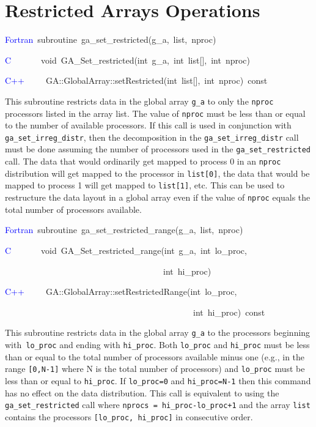 \section{Restricted Arrays Operations}
\begin{lyxcode}
\textcolor{blue}{Fortran}~subroutine~ga\_set\_restricted(g\_a,~list,~nproc)~

\textcolor{blue}{C~}~~~~~~void~GA\_Set\_restricted(int~g\_a,~int~list{[}{]},~int~nproc)~

\textcolor{blue}{C++}~~~~~GA::GlobalArray::setRestricted(int~list{[}{]},~int~nproc)~const
\end{lyxcode}
This subroutine restricts data in the global array \texttt{g\_a} to
only the \texttt{nproc} processors listed in the array list. The value
of \texttt{nproc} must be less than or equal to the number of available
processors. If this call is used in conjunction with \texttt{ga\_set\_irreg\_distr},
then the decomposition in the \texttt{ga\_set\_irreg\_distr} call
must be done assuming the number of processors used in the \texttt{ga\_set\_restricted}
call. The data that would ordinarily get mapped to process 0 in an
\texttt{nproc} distribution will get mapped to the processor in \texttt{list{[}0{]}},
the data that would be mapped to process 1 will get mapped to \texttt{list{[}1{]}},
etc. This can be used to restructure the data layout in a global array
even if the value of \texttt{nproc} equals the total number of processors
available. 
\begin{lyxcode}
\textcolor{blue}{Fortran}~subroutine~ga\_set\_restricted\_range(g\_a,~list,~nproc)~

\textcolor{blue}{C}~~~~~~~void~GA\_Set\_restricted\_range(int~g\_a,~int~lo\_proc,~

~~~~~~~~~~~~~~~~~~~~~~~~~~~~~~~~~~~~~int~hi\_proc)~

\textcolor{blue}{C++~}~~~~GA::GlobalArray::setRestrictedRange(int~lo\_proc,~

~~~~~~~~~~~~~~~~~~~~~~~~~~~~~~~~~~~~~~~~~~~~int~hi\_proc)~const
\end{lyxcode}
This subroutine restricts data in the global array \texttt{g\_a} to
the processors beginning with\texttt{ lo\_proc} and ending with \texttt{hi\_proc}.
Both \texttt{lo\_proc} and \texttt{hi\_proc} must be less than or
equal to the total number of processors available minus one (e.g.,
in the range \texttt{{[}0,N-1{]}} where N is the total number of processors)
and \texttt{lo\_proc} must be less than or equal to \texttt{hi\_proc}.
If \texttt{lo\_proc=0} and \texttt{hi\_proc=N-1} then this command
has no effect on the data distribution. This call is equivalent to
using the \texttt{ga\_set\_restricted} call where \texttt{nprocs =
hi\_proc-lo\_proc+1} and the array \texttt{list} contains the processors
\texttt{{[}lo\_proc, hi\_proc{]}} in consecutive order. 
